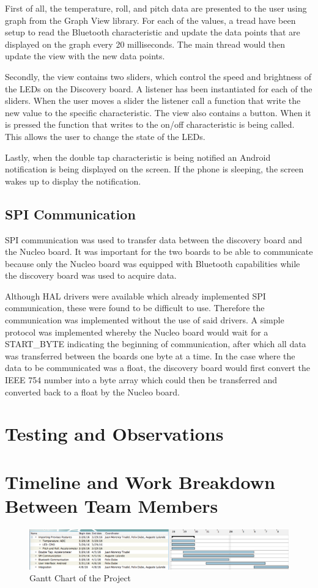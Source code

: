 \documentclass[12pt]{article}
\begin{document}
First of all, the temperature, roll, and pitch data are presented to the user using graph from the Graph View library. For each of the values, a tread have been setup to read the Bluetooth characteristic and update the data points that are displayed on the graph every 20 milliseconds. The main thread would then update the view with the new data points.

Secondly, the view contains two sliders, which control the speed and brightness of the LEDs on the Discovery board. A listener has been instantiated for each of the sliders. When the user moves a slider the listener call a function that write the new value to the specific characteristic. The view also contains a button. When it is pressed the function that writes to the on/off characteristic is being called. This allows the user to change the state of the LEDs.

Lastly, when the double tap characteristic is being notified an Android notification is being displayed on the screen. If the phone is sleeping, the screen wakes up to display the notification.

\subsection{SPI Communication}
SPI communication was used to transfer data between the discovery board and the Nucleo board. It was important for the two boards to be able to communicate because only the Nucleo board was equipped with Bluetooth capabilities while the discovery board was used to acquire data.

Although HAL drivers were available which already implemented SPI communication, these were found to be difficult to use. Therefore the communication was implemented without the use of said drivers. A simple protocol was implemented whereby the Nucleo board would wait for a START\_BYTE indicating the beginning of communication, after which all data was transferred between the boards one byte at a time. In the case where the data to be communicated was a float, the discovery board would first convert the IEEE 754 number into a byte array which could then be transferred and converted back to a float by the Nucleo board.

\section{Testing and Observations}

\section{Timeline and Work Breakdown Between Team Members}
\begin{figure}[!htb]
 \centering
 \includegraphics[scale=0.4]{images/gantt}
 \caption{Gantt Chart of the Project}
 \label{fig:softArch}
\end{figure}
\end{document}
